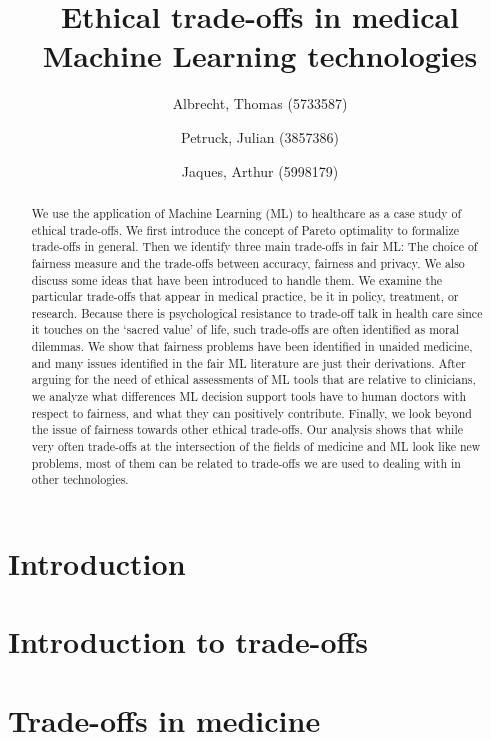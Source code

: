 \documentclass[11pt,english]{article}
\title{Ethical trade-offs in medical Machine Learning technologies}
\author{
    Albrecht, Thomas (5733587)
    \and
    Petruck, Julian (3857386)
    \and
    Jaques, Arthur (5998179)}
\begin{document}

\maketitle

\begin{abstract}
We use the application of Machine Learning (ML) to healthcare as a case study of ethical trade-offs.
We first introduce the concept of Pareto optimality to formalize trade-offs in general.
Then we identify three main trade-offs in fair ML: The choice of fairness measure and the trade-offs between accuracy, fairness and privacy. 
We also discuss some ideas that have been introduced to handle them.
We examine the particular trade-offs that appear in medical practice, be it in policy, treatment, or research. Because there is psychological resistance to trade-off talk in health care since it touches on the `sacred value' of life, such trade-offs are often identified as moral dilemmas. We show that fairness problems have been identified in unaided medicine, and many issues identified in the fair ML literature are just their derivations. After arguing for the need of ethical assessments of ML tools that are relative to clinicians, we analyze what differences ML decision support tools have to human doctors with respect to fairness, and what they can positively contribute.
Finally, we look beyond the issue of fairness towards other ethical trade-offs. Our analysis shows that while very often trade-offs at the intersection of the fields of medicine and ML look like new problems, most of them can be related to trade-offs we are used to dealing with in other technologies.
\end{abstract}


\clearpage
\setcounter{tocdepth}{2}
\tableofcontents
\clearpage


\section{Introduction}
\label{introduction}


\section{Introduction to trade-offs}
\label{tradeoff}


\section{Trade-offs in medicine}
\label{medicine}

\end{document}
